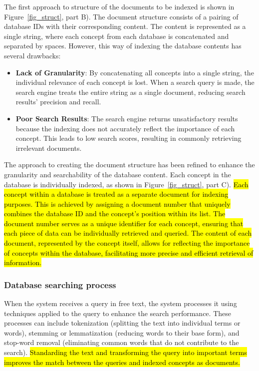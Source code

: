 The first approach to structure of the documents to be indexed is shown in Figure~\ref{fig_struct}, part B). The document structure consists of a pairing of database IDs with their corresponding content. The content is represented as a single string, where each concept from each database is concatenated and separated by spaces. However, this way of indexing the database contents has several drawbacks: 

\begin{itemize}
    \item \textbf{Lack of Granularity}: By concatenating all concepts into a single string, the individual relevance of each concept is lost. When a search query is made, the search engine treats the entire string as a single document, reducing search results' precision and recall.
    \item \textbf{Poor Search Results}: The search engine returns unsatisfactory results because the indexing does not accurately reflect the importance of each concept. This leads to low search scores, resulting in commonly retrieving irrelevant documents.
\end{itemize}

The approach to creating the document structure has been refined to enhance the granularity and searchability of the database content. Each concept in the database is individually indexed, as shown in Figure~\ref{fig_struct}, part C). \hl{Each concept within a database is treated as a separate document for indexing purposes. This is achieved by assigning a document number that uniquely combines the database ID and the concept's position within its list. The document number serves as a unique identifier for each concept, ensuring that each piece of data can be individually retrieved and queried. The content of each document, represented by the concept itself, allows for reflecting the importance of concepts within the database, facilitating more precise and efficient retrieval of information.}


\subsubsection{Database searching process}
\label{searchprocess}

When the {\ir} system receives a query in free text, the system processes it using {\nlp} techniques applied to the query to enhance the search performance. These processes can include tokenization (splitting the text into individual terms or words), stemming or lemmatization (reducing words to their base form), and stop-word removal (eliminating common words that do not contribute to the search). \hl{Standarding the text and transforming the query into important terms improves the match between the queries and indexed concepts as documents.}

